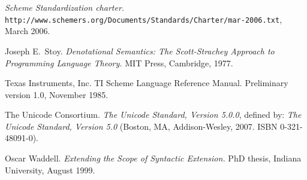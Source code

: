 \begin{thebibliography}{999}
{\em Scheme Standardization charter.}
{\tt
  http://www.schemers.org/\linebreak[1]Documents/\linebreak[1]Standards/\linebreak[1]Charter/\linebreak[1]mar-2006.txt},
March 2006.

Joseph E.~Stoy.
{\em Denotational Semantics: The Scott-Strachey Approach to
  Programming Language Theory.}
MIT Press, Cambridge, 1977.

Texas Instruments, Inc.
TI Scheme Language Reference Manual.
Preliminary version 1.0, November 1985. 

The Unicode Consortium.
{\em  The Unicode Standard, Version 5.0.0},
defined by: {\em The Unicode Standard, Version 5.0} (Boston, MA,
 Addison-Wesley, 2007. ISBN 0-321-48091-0).

Oscar Waddell.
{\em Extending the Scope of Syntactic Extension.}
PhD thesis, Indiana University, August 1999.

\end{thebibliography}

